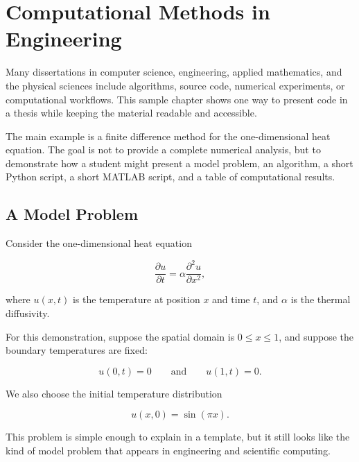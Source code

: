 \chapter{Computational Methods in Engineering}
\label{chap:computational-methods}

Many dissertations in computer science, engineering, applied mathematics, and the physical sciences include algorithms, source code, numerical experiments, or computational workflows. This sample chapter shows one way to present code in a thesis while keeping the material readable and accessible.

The main example is a finite difference method for the one-dimensional heat equation. The goal is not to provide a complete numerical analysis, but to demonstrate how a student might present a model problem, an algorithm, a short Python script, a short MATLAB script, and a table of computational results.

\section{A Model Problem}
\label{sec:computational-model-problem}

Consider the one-dimensional heat equation

\begin{equation}
\frac{\partial u}{\partial t}
=
\alpha
\frac{\partial^2 u}{\partial x^2},
\label{eq:heat-equation}
\end{equation}

where \(u(x,t)\) is the temperature at position \(x\) and time \(t\), and \(\alpha\) is the thermal diffusivity.

For this demonstration, suppose the spatial domain is \(0\leq x\leq 1\), and suppose the boundary temperatures are fixed:

\begin{equation}
u(0,t)=0
\qquad\text{and}\qquad
u(1,t)=0.
\label{eq:heat-boundary-conditions}
\end{equation}

We also choose the initial temperature distribution

\begin{equation}
u(x,0)=\sin(\pi x).
\label{eq:heat-initial-condition}
\end{equation}

This problem is simple enough to explain in a template, but it still looks like the kind of model problem that appears in engineering and scientific computing.

